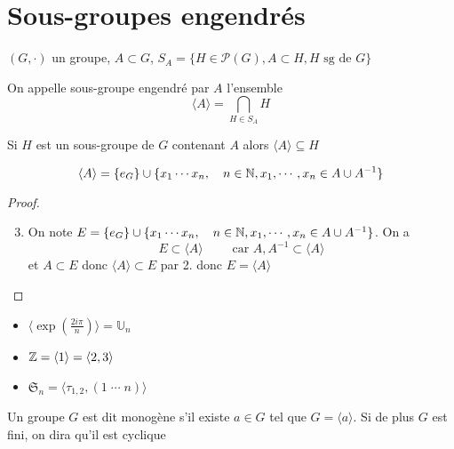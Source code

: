 \section{Sous-groupes engendrés}

\begin{thmdef}
    \Hyp $(G, \cdot)$ un groupe, $A\subset G$, $S_A=\{H\in\mathcal P(G), A\subset H, H\text{ sg de }G\}$
    \begin{concenum}
    \item On appelle sous-groupe engendré par $A$ l'ensemble \[
            \langle A\rangle = \bigcap_{H\in S_A}H
        \]
    \item Si $H$ est un sous-groupe de $G$ contenant $A$ alors $\langle A\rangle \subseteq H$
    \item \[
            \langle A\rangle =\{e_G\}\cup \{x_1\cdots x_n, \quad n\in\mathbb N, x_1, \cdots, x_n\in A\cup A^{-1}\}
        \]
    \end{concenum}
\end{thmdef}

\begin{proof}~
    \begin{enumerate}
        \setcounter{enumi}{2}
    \item On note $E=\{e_G\}\cup \{x_1\cdots x_n, \quad n\in\mathbb N, x_1, \cdots, x_n\in A\cup A^{-1}\}$. On a \[
            E\subset \langle A\rangle\qquad \text{ car }A,A^{-1}\subset \langle A\rangle
        \]
        et $A\subset E$ donc $\langle A\rangle \subset E$ par 2. donc $E=\langle A\rangle$
\end{enumerate}
\end{proof}

\begin{ex}
    \begin{itemize}
        \item $\langle \exp \left( \frac{2i\pi}n \right)\rangle=\mathbb U_n$
        \item $\mathbb Z=\langle 1\rangle = \langle 2, 3\rangle$
        \item $\mathfrak S_n=\langle \tau_{1,2}, (1\;\cdots\; n)\rangle$
    \end{itemize}
\end{ex}

\begin{dfn}
    Un groupe $G$ est dit monogène s'il existe $a\in G$ tel que $G=\langle a\rangle$. Si de plus $G$ est fini, on dira qu'il est cyclique
\end{dfn}


